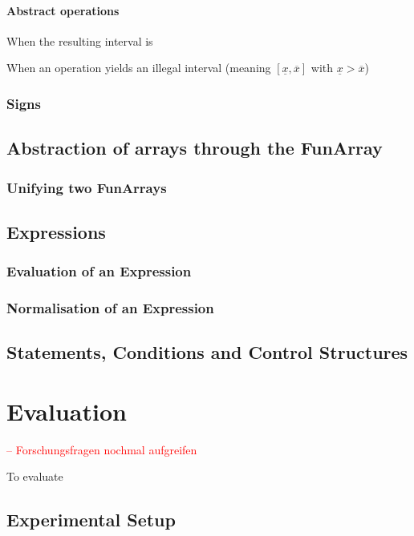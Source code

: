 \documentclass{report}
\begin{document}


\subsubsection{Abstract operations}



When the resulting interval is 


When an operation yields an illegal interval (meaning $[\underline{x},\overline{x}]$ with $\underline{x}>\overline{x}$)







\subsection{Signs}
\section{Abstraction of arrays through the FunArray}
\subsection{Unifying two FunArrays}
\section{Expressions}
\subsection{Evaluation of an Expression}
\subsection{Normalisation of an Expression}

\section{Statements, Conditions and Control Structures}


\chapter{Evaluation}
\textcolor{red}{-- Forschungsfragen nochmal aufgreifen}

To evaluate 

\section{Experimental Setup}
\end{document}
